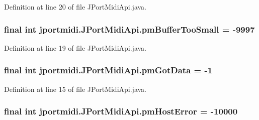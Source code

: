 Definition at line 20 of file J\+Port\+Midi\+Api.\+java.

\subsubsection[{\texorpdfstring{pm\+Buffer\+Too\+Small}{pmBufferTooSmall}}]{\setlength{\rightskip}{0pt plus 5cm}final {\bf int} jportmidi.\+J\+Port\+Midi\+Api.\+pm\+Buffer\+Too\+Small = -\/9997}\hypertarget{classjportmidi_1_1_j_port_midi_api_a66cc6b037573ac5c2e2c208fe0f0973e}{}\label{classjportmidi_1_1_j_port_midi_api_a66cc6b037573ac5c2e2c208fe0f0973e}


Definition at line 19 of file J\+Port\+Midi\+Api.\+java.

\subsubsection[{\texorpdfstring{pm\+Got\+Data}{pmGotData}}]{\setlength{\rightskip}{0pt plus 5cm}final {\bf int} jportmidi.\+J\+Port\+Midi\+Api.\+pm\+Got\+Data = -\/1}\hypertarget{classjportmidi_1_1_j_port_midi_api_ac8429756af89a9b6959dd02286a0aeab}{}\label{classjportmidi_1_1_j_port_midi_api_ac8429756af89a9b6959dd02286a0aeab}


Definition at line 15 of file J\+Port\+Midi\+Api.\+java.

\subsubsection[{\texorpdfstring{pm\+Host\+Error}{pmHostError}}]{\setlength{\rightskip}{0pt plus 5cm}final {\bf int} jportmidi.\+J\+Port\+Midi\+Api.\+pm\+Host\+Error = -\/10000}\hypertarget{classjportmidi_1_1_j_port_midi_api_a90efa51595ec49e5bf267f3a0967814c}{}\label{classjportmidi_1_1_j_port_midi_api_a90efa51595ec49e5bf267f3a0967814c}


